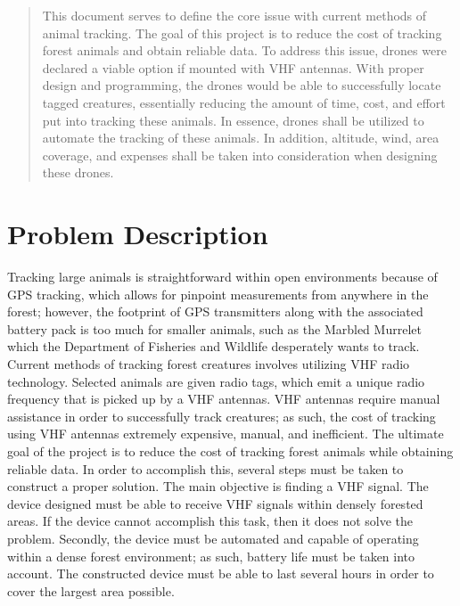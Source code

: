 \documentclass[onecolumn, draftclsnofoot,10pt, compsoc]{IEEEtran}
\begin{document}
\begin{titlepage}
\begin{singlespace}
{        }
        \begin{abstract}
        	This document serves to define the core issue with current methods of animal tracking. The goal of this project is to reduce the cost of tracking forest animals and obtain reliable data. To address this issue, drones were declared a viable option if mounted with VHF antennas. With proper design and programming, the drones would be able to successfully locate tagged creatures, essentially reducing the amount of time, cost, and effort put into tracking these animals. In essence, drones shall be utilized to automate the tracking of these animals. In addition, altitude, wind, area coverage, and expenses shall be taken into consideration when designing these drones.
        \end{abstract}     
    \end{singlespace}
\end{titlepage}
\newpage
{}
\tableofcontents
\clearpage

\section{Problem Description}
Tracking large animals is straightforward within open environments because of GPS tracking, which allows for pinpoint measurements from anywhere in the forest; however, the footprint of GPS transmitters along with the associated battery pack is too much for smaller animals, such as the Marbled Murrelet which the Department of Fisheries and Wildlife desperately wants to track. Current methods of tracking forest creatures involves utilizing VHF radio technology. Selected animals are given radio tags, which emit a unique radio frequency that is picked up by a VHF antennas. VHF antennas require manual assistance in order to successfully track creatures; as such, the cost of tracking using VHF antennas extremely expensive, manual, and inefficient. The ultimate goal of the project is to reduce the cost of tracking forest animals while obtaining reliable data. In order to accomplish this, several steps must be taken to construct a proper solution. The main objective is finding a VHF signal. The device designed must be able to receive VHF signals within densely forested areas. If the device cannot accomplish this task, then it does not solve the problem. Secondly, the device must be automated and capable of operating within a dense forest environment; as such, battery life must be taken into account. The constructed device must be able to last several hours in order to cover the largest area possible.
\end{document}
